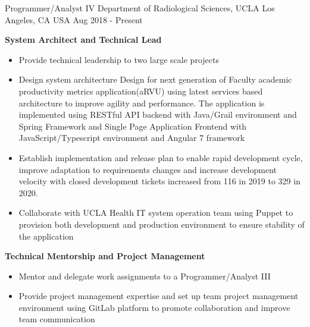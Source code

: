 


\begin{cventries}


	
  \cventry
    {Programmer/Analyst IV} %
    {Department of Radiological Sciences, UCLA} %
    {Los Angeles, CA USA} %
    {Aug 2018 - Present} %
    {
      \begin{cvitems} %
        \item[] { {\bf System Architect and Technical Lead}
            \begin{itemize} %
                \item {Provide technical leadership to two large scale projects}
                \item {Design system architecture Design for next generation of Faculty academic productivity metrics application(aRVU) using latest services based architecture to improve agility and performance. The application is implemented using RESTful API backend with Java/Grail environment and Spring Framework and Single Page Application Frontend with JavaScript/Typescript environment and Angular 7 framework}
                \item {Establish implementation and release plan to enable rapid development cycle, improve adaptation to requirements changes and increase development velocity with closed development tickets increased from 116 in 2019 to 329 in 2020.}
                \item {Collaborate with UCLA Health IT system operation team using Puppet to provision both development and production environment to ensure stability of the application}
              \end{itemize}}
        \item[] { {\bf Technical Mentorship and Project Management} 
            \begin{itemize} %
                \item {Mentor and delegate work assignments to a Programmer/Analyst III}
                \item {Provide project management expertise and set up team project management environment using GitLab platform to promote collaboration and improve team communication}
              \end{itemize}}
      \end{cvitems}
    }



\end{cventries}
